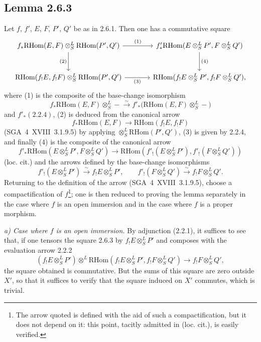 \documentclass[11pt]{article}
\providecommand{\RHom}{\mathrm{RHom}}
\providecommand{\RHom}{\mathrm{RHom}}
\providecommand{\RHom}{\mathrm R\mathcal{H}om}
\providecommand{\RHom}{\mathrm{RHom}}
\begin{document}
\subsection*{Lemma 2.6.3}
Let $f$, $f'$, $E$, $F$, $P'$, $Q'$ be as in 2.6.1. Then one has a commutative square
\[
\begin{tikzcd}[column sep=large,row sep=large]
f_*\RHom(E,F)\otimes^L_S\RHom(P',Q') \arrow[r,"(1)"] \arrow[d,"(2)"'] & f'_*\RHom(E\otimes^L_SP',F\otimes^L_SQ') \arrow[d,"(4)"]\\
\RHom(f_!E,f_!F)\otimes^L_S\RHom(P',Q') \arrow[r,"(3)"'] & \RHom(f_!E\otimes^L_SP',f_!F\otimes^L_SQ'),
\end{tikzcd}
\]
where (1) is the composite of the base-change isomorphism
\[
f_*\RHom(E,F)\otimes^L_S -\xrightarrow{\sim}f'_*\bigl(\RHom(E,F)\otimes^L_S-\bigr)
\]
and $f'_*(2.2.4)$, (2) is deduced from the canonical arrow
\[
f_*\RHom(E,F)\longrightarrow\RHom(f_!E,f_!F)
\]
(SGA~4~XVIII~3.1.9.5) by applying $\otimes^L_S\RHom(P',Q')$, (3) is given by 2.2.4, and finally (4) is the composite of the canonical arrow
\[
f'_*\RHom(E\otimes^L_SP',F\otimes^L_SQ')
\longrightarrow
\RHom(f'_!(E\otimes^L_SP'),f'_!(F\otimes^L_SQ'))
\]
(loc. cit.) and the arrows defined by the base-change isomorphisms
\[
f'_!(E\otimes^L_SP')\xrightarrow{\sim}f_!E\otimes^L_SP',
\qquad
f'_!(F\otimes^L_SQ')\xrightarrow{\sim}f_!F\otimes^L_SQ'.
\]
Returning to the definition of the arrow (SGA~4~XVIII~3.1.9.5), choose a compactification of $f$\footnote{The arrow quoted is defined with the aid of such a compactification, but it does not depend on it: this point, tacitly admitted in (loc. cit.), is easily verified.}; one is then reduced to proving the lemma separately in the case where $f$ is an open immersion and in the case where $f$ is a proper morphism.

\emph{a) Case where $f$ is an open immersion.} By adjunction (2.2.1), it suffices to see that, if one tensors the square 2.6.3 by $f_!E\otimes^L_SP'$ and composes with the evaluation arrow 2.2.2
\[
(f_!E\otimes^L_SP')\otimes^L\RHom(f_!E\otimes^L_SP',f_!F\otimes^L_SQ')\longrightarrow f_!F\otimes^L_SQ',
\]
the square obtained is commutative. But the sums of this square are zero outside $X'$, so that it suffices to verify that the square induced on $X'$ commutes, which is trivial.
\end{document}
